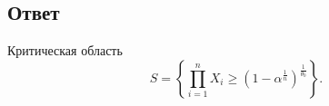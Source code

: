 \subsection*{Ответ}
Критическая область
\begin{equation}
    S = \left \{ \prod_{i=1}^n X_i \ge \left ( 1 - \alpha^{\frac{1}{n}} \right )^\frac{1}{\theta_0} \right \} .
\end{equation}